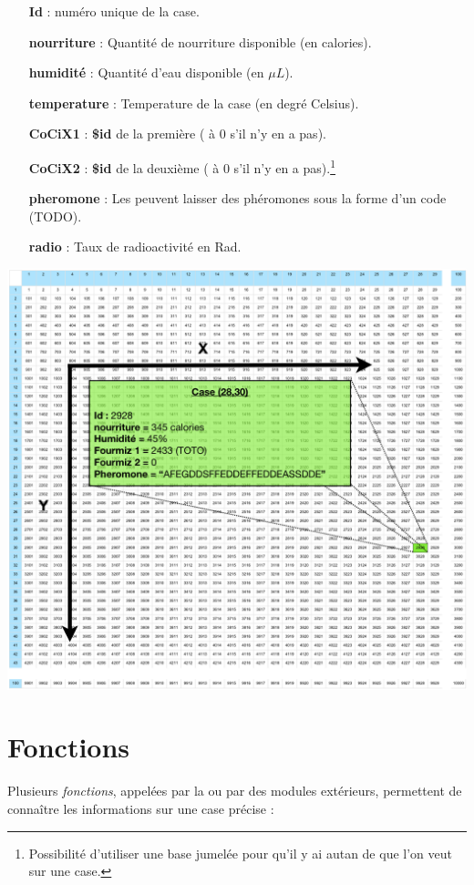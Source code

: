 \documentclass[french]{report}
\begin{document}
\begin{itemize}
	\item[\textbf{Id}] : numéro unique de la case. 
	\item[\textbf{nourriture}] : Quantité de nourriture disponible (en calories).
	\item[\textbf{humidité}] : Quantité d'eau disponible (en $\mu L$).
	\item[\textbf{temperature}] : Temperature de la case (en degré Celsius).
	\item[\textbf{CoCiX1}] : \textbf{\$id} de la première \CoCiX ( à 0 s'il n'y en a pas).
	\item[\textbf{CoCiX2}] : \textbf{\$id} de la deuxième \CoCiX ( à 0 s'il n'y en a pas).\footnote{Possibilité d'utiliser une base jumelée pour qu'il y ai autan de \CoCiX que l'on veut sur une case.}
	\item[\textbf{pheromone}] : Les \CoCiX peuvent laisser des phéromones sous la forme d'un code (TODO).
	\item[\textbf{radio}] : Taux de radioactivité en Rad.\\
\end{itemize}

\centerline{\includegraphics[width=18cm]{Monde01.png}}\label{cartemode}

\section{Fonctions}\label{methodes_monde}
Plusieurs \textit{fonctions}, appelées par la \CoCiX ou par des modules extérieurs, permettent de connaître les informations sur une case précise : \\
\end{document}
